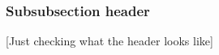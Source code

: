 \ifboyscout
\subsubsection{Subsubsection header}
[Just checking what the header looks like]
\else
\fi



%
